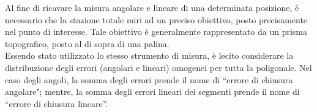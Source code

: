 Al fine di ricavare la misura angolare e lineare di una determinata posizione, è necessario che la stazione totale miri ad un preciso obiettivo, posto precisamente nel punto di interesse. Tale obiettivo è generalmente rappresentato da un prisma topografico, posto al di sopra di una palina.\\
Essendo stato utilizzato lo stesso strumento di misura, è lecito considerare la distribuzione degli errori (angolari e lineari) omogenei per tutta la poligonale. Nel caso degli angoli, la somma degli errori prende il nome di ``errore di chiusura angolare"; mentre, la somma degli errori lineari dei segmenti prende il nome di ``errore di chiusura lineare''.\\

